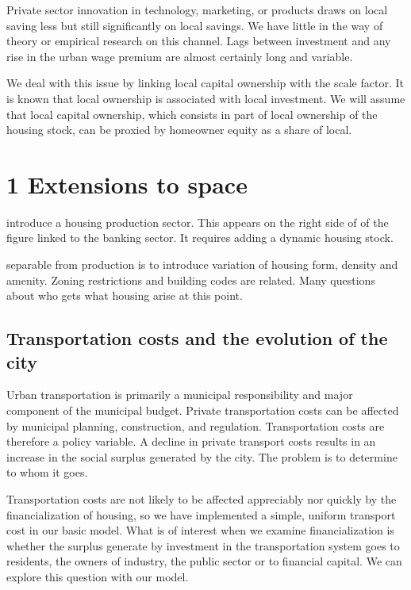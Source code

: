 Private sector innovation in technology, marketing, or products draws on local saving less but still significantly on local savings. We have little in the way of theory or empirical research on this channel. Lags between investment and any rise in the urban wage premium are almost certainly long and variable. 

We deal with this issue by linking local capital ownership with the scale factor. It is known that local ownership is associated with local investment. We will assume that local capital ownership, which consists in part of local ownership of the housing stock, can be proxied by homeowner equity as a share of local. 

\section{1 Extensions to space} %

introduce a housing production sector. This appears on the right side of of the figure linked to the banking sector. It requires adding a dynamic housing stock. 

separable from production is to introduce variation of housing form,  density and amenity. Zoning restrictions and building codes are related. Many questions about who gets what housing arise at this point. 

\subsection{Transportation costs and the evolution of the city} \label{section-transportation}

Urban transportation is primarily a municipal responsibility and major component of the municipal budget. Private transportation costs can be affected by municipal planning, construction, and regulation. Transportation costs are therefore a policy variable.  A decline in private transport costs results in an increase in the social surplus generated by the city. The problem is to determine to whom it goes. 

Transportation costs are not likely to be affected appreciably nor quickly by the financialization of housing,
so we have implemented a simple, uniform transport cost in our basic model. What is of interest when we examine financialization is whether the surplus generate by investment in the transportation system goes to residents, the owners of industry, the public sector or to financial capital. We can explore this question with our model. 

